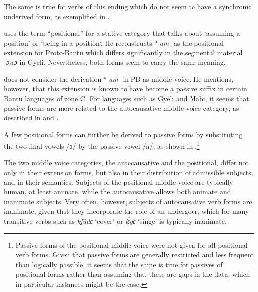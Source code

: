 \noindent The same is true for verbs of this ending which do not seem to have a synchronic underived form, as exemplified in .



\citet[75]{schadeberg2003} uses the term ``positional'' for a stative category that talks about ‘assuming a position’ or ‘being in a position’. He reconstructs °{\itshape -am-} as the positional extension for Proto-Bantu which differs significantly in the segmental material {\itshape -ɔwɔ} in Gyeli. Nevertheless, both forms seem to carry the same meaning.

\citet[76]{schadeberg2003} does not consider the derivation °{\itshape -am-} in PB as middle voice. He mentions, however, that this extension is known to have become a passive suffix in certain Bantu languages of zone C. For languages such as Gyeli and Mabi, it seems that passive forms are more related to the autocausative middle voice category, as described in  and .


A few positional forms can further be derived to passive forms by substituting the two final vowels /ɔ/ by the passive vowel /a/, as shown in .\footnote{Passive forms of the positional middle voice were not given for all positional verb forms. Given that passive forms are generally restricted and less frequent than logically possible, it seems that the same is true for passives of positional forms rather than assuming that these are gaps in the data, which in particular instances might be the case.}



The two middle voice categories, the autocausative and the positional, differ not only in their extension forms, but also in their distribution of admissible subjects, and in their semantics. Subjects of the positional middle voice are typically human, at least animate, while the autocausative allows both animate and inanimate subjects. Very often, however, subjects of autocausative verb forms are inanimate, given that they incorporate the role of an undergoer, which for many transitive verbs such as {\itshape kfúdɛ} `cover' or {\itshape lɛ́gɛ} `singe' is typically inanimate.

